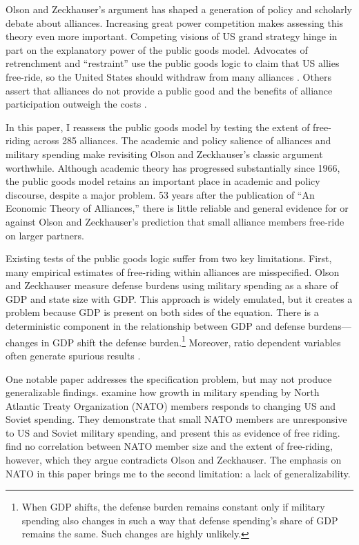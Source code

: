 \documentclass[12pt]{article}
\begin{document}
Olson and Zeckhauser's argument has shaped a generation of policy and scholarly debate about alliances. 
Increasing great power competition makes assessing this theory even more important. 
Competing visions of US grand strategy hinge in part on the explanatory power of the public goods model. 
Advocates of retrenchment and ``restraint'' use the public goods logic to claim that US allies free-ride, so the United States should withdraw from many alliances \citep{Preble2009, Posen2014}. 
Others assert that alliances do not provide a public good and the benefits of alliance participation outweigh the costs \citep{Brooksetal2013, BrandsFeaver2017}. 


In this paper, I reassess the public goods model by testing the extent of free-riding across 285 alliances. 
The academic and policy salience of alliances and military spending make revisiting Olson and Zeckhauser's classic argument worthwhile.
Although academic theory has progressed substantially since 1966, the public goods model retains an important place in academic and policy discourse, despite a major problem.
53 years after the publication of ``An Economic Theory of Alliances,'' there is little reliable and general evidence for or against Olson and Zeckhauser's prediction that small alliance members free-ride on larger partners. 


Existing tests of the public goods logic suffer from two key limitations.
First, many empirical estimates of free-riding within alliances are misspecified.
Olson and Zeckhauser measure defense burdens using military spending as a share of GDP and state size with GDP.
This approach is widely emulated, but it creates a problem because GDP is present on both sides of the equation.
There is a deterministic component in the relationship between GDP and defense burdens--- changes in GDP shift the defense burden.\footnote{
When GDP shifts, the defense burden remains constant only if military spending also changes in such a way that defense spending's share of GDP remains the same. Such changes are highly unlikely.}  
Moreover, ratio dependent variables often generate spurious results \citep{Kronmal1993}.
 

One notable paper addresses the specification problem, but may not produce generalizable findings. 
\citet{PluemperNeumayer2015} examine how growth in military spending by North Atlantic Treaty Organization (NATO) members responds to changing US and Soviet spending.
They demonstrate that small NATO members are unresponsive to US and Soviet military spending, and present this as evidence of free riding.
\citet{PluemperNeumayer2015} find no correlation between NATO member size and the extent of free-riding, however, which they argue contradicts Olson and Zeckhauser.
The emphasis on NATO in this paper brings me to the second limitation: a lack of generalizability. 
\end{document}
